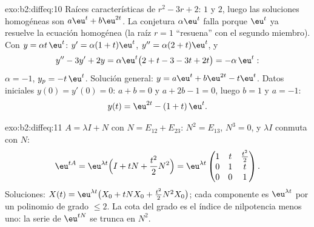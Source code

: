 \begin{solution}{exo:b2:diffeq:10}
Raíces características de $r^2 - 3r + 2$: $1$ y $2$, luego las
soluciones homogéneas son $a\eu^t + b\eu^{2t}$. La conjetura
$\alpha\eu^t$ falla porque $\eu^t$ ya resuelve la ecuación homogénea
(la raíz $r = 1$ ``resuena'' con el segundo miembro). Con $y = \alpha
t\,\eu^t$: $y' = \alpha(1 + t)\eu^t$, $y'' = \alpha(2 + t)\eu^t$, y
\[
y'' - 3y' + 2y = \alpha\eu^t\bigl(2 + t - 3 - 3t + 2t\bigr)
= -\alpha\,\eu^t :
\]
$\alpha = -1$, $y_p = -t\,\eu^t$. Solución general: $y = a\eu^t +
b\eu^{2t} - t\eu^t$. Datos iniciales $y(0) = y'(0) = 0$: $a + b = 0$
y $a + 2b - 1 = 0$, luego $b = 1$ y $a = -1$:
\[
y(t) = \eu^{2t} - (1 + t)\,\eu^{t} .
\]

\end{solution}

\begin{solution}{exo:b2:diffeq:11}
$A = \lambda I + N$ con $N = E_{12} + E_{23}$: $N^2 = E_{13}$, $N^3 =
0$, y $\lambda I$ conmuta con $N$:
\[
\eu^{tA} = \eu^{\lambda t}\Bigl(I + tN +
\frac{t^2}{2}N^2\Bigr)
= \eu^{\lambda t}\begin{pmatrix}
1 & t & \frac{t^2}{2}\\
0 & 1 & t\\
0 & 0 & 1
\end{pmatrix}.
\]
Soluciones: $X(t) = \eu^{\lambda t}\bigl(X_0 + tNX_0 +
\frac{t^2}2N^2X_0\bigr)$; cada componente es $\eu^{\lambda t}$ por un
polinomio de grado $\leq 2$. La cota del grado es el índice de
nilpotencia menos uno: la serie de $\eu^{tN}$ se trunca en $N^2$.
\end{solution}

